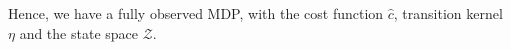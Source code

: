 \documentclass[11pt]{article}
\def\P{{\mathcal P}}
\begin{document}
Hence, we have a fully observed MDP, with the cost function $\hat{c}$, transition kernel ${\eta}$ and the state space ${\mathcal{Z}}$.



\end{document}
